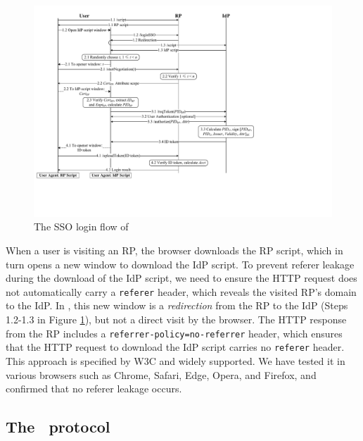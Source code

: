 \begin{figure}[htb]
  \centering
  \includegraphics[height=0.455\textheight]{fig/process-js.pdf}
  \caption{The SSO login flow of \usso}
  \label{fig:process}
\end{figure}

When a user is visiting an RP, the browser downloads the RP script, which in turn opens a new window to download the IdP script. To prevent referer leakage during the download of the IdP script, we need to ensure the HTTP request does not automatically carry a \verb+referer+ header, which reveals the visited RP's domain to the IdP. %
In \usso, this new window is a \emph{redirection} from the RP to the IdP (Steps 1.2-1.3 in Figure \ref{fig:process}), but not a direct visit by the browser.
The HTTP response from the RP includes a \verb+referrer-policy=no-referrer+ header, which ensures that the HTTP request to download the IdP script carries no \verb+referer+ header.
This approach is specified by W3C \cite{referer_policy} and widely supported. We have tested it in various browsers such as Chrome, Safari, Edge, Opera, and Firefox, and confirmed that no referer leakage occurs.




\subsection{The \usso\ protocol}
\label{implementations}

